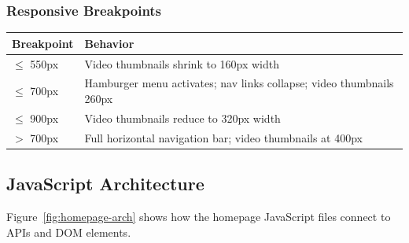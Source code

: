 \documentclass[12pt]{article}
\begin{document}
\subsubsection{Responsive Breakpoints}

\begin{longtable}{p{4cm}p{9cm}}
\toprule
\textbf{Breakpoint} & \textbf{Behavior} \\
\midrule
$\leq$ 550px & Video thumbnails shrink to 160px width \\
$\leq$ 700px & Hamburger menu activates; nav links collapse; video thumbnails 260px \\
$\leq$ 900px & Video thumbnails reduce to 320px width \\
$>$ 700px & Full horizontal navigation bar; video thumbnails at 400px \\
\bottomrule
\end{longtable}

\subsection{JavaScript Architecture}

Figure~\ref{fig:homepage-arch} shows how the homepage JavaScript files connect to APIs and DOM elements.
\end{document}
